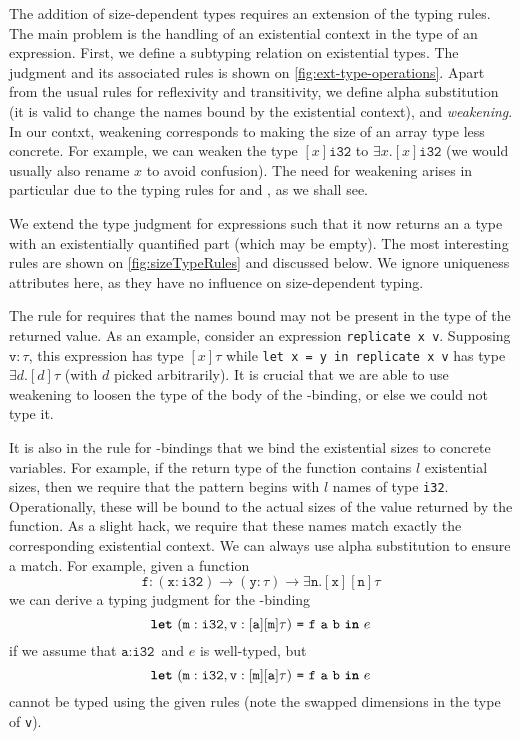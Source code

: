 The addition of size-dependent types requires an extension of the
typing rules.  The main problem is the handling of an existential
context in the type of an expression.  First, we define a subtyping
relation on existential types.  The judgment and its associated rules
is shown on \cref{fig:ext-type-operations}.  Apart from the usual
rules for reflexivity and transitivity, we define alpha substitution
(it is valid to change the names bound by the existential context),
and \textit{weakening}.  In our contxt, weakening corresponds to
making the size of an array type less concrete.  For example, we can
weaken the type $[x]\texttt{i32}$ to $\exists x.[x]\texttt{i32}$ (we
would usually also rename $x$ to avoid confusion).  The need for
weakening arises in particular due to the typing rules for 
and , as we shall see.

We extend the type judgment for expressions such that it now returns
an a type with an existentially quantified part (which may be empty).
The most interesting rules are shown on \cref{fig:sizeTypeRules} and
discussed below.  We ignore uniqueness attributes here, as they have
no influence on size-dependent typing.

The rule for  requires that the names bound may not be present
in the type of the returned value.  As an example, consider an
expression \lstinline{replicate x v}.  Supposing $\texttt{v}: \tau$,
this expression has type $[x]\tau$ %
while \mbox{\lstinline{let x = y in replicate x v}} has type
$\exists d.[d]\tau$ (with $d$ picked arbitrarily).  It is crucial that
we are able to use weakening to loosen the type of the body of the
-binding, or else we could not type it.

It is also in the rule for -bindings that we bind the
existential sizes to concrete variables.  For example, if the return
type of the function contains $l$ existential sizes, then we require
that the pattern begins with $l$ names of type \texttt{i32}.
Operationally, these will be bound to the actual sizes of the value
returned by the function.  As a slight hack, we require that these
names match exactly the corresponding existential context.  We can
always use alpha substitution to ensure a match.  For example, given a
function
\[
  \texttt{f}: (\texttt{x}: \texttt{i32}) \rightarrow (\texttt{y}: \tau) \rightarrow \exists \texttt{n}.[\texttt{x}][\texttt{n}]\tau
\]
we can derive a typing judgment for the -binding
\[
\mbox{\texttt{\bfseries{let}}}~(\texttt{m}: \texttt{i32}, \texttt{v}: [\texttt{a}][\texttt{m}]\tau)~\mbox{\texttt{=}}~\texttt{f}~\texttt{a}~\texttt{b}~\mbox{\texttt{\bfseries{in}}}~e
\]
if we assume that $\texttt{a}: \texttt{i32}$ and $e$ is well-typed,
but
\[
\mbox{\texttt{\bfseries{let}}}~(\texttt{m}: \texttt{i32}, \texttt{v}: [\texttt{m}][\texttt{a}]\tau)~\mbox{\texttt{=}}~\texttt{f}~\texttt{a}~\texttt{b}~\mbox{\texttt{\bfseries{in}}}~e
\]
cannot be typed using the given rules (note the swapped dimensions in
the type of \texttt{v}).

